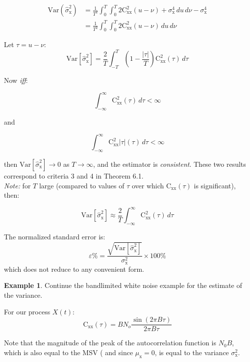 \documentclass[12pt]{book}
\theoremstyle{definition}
\newtheorem{exmp}{Example}[chapter]
\begin{document}
\[
\begin{aligned}
    \mathrm{Var}(\hat{\sigma}^2_\mathrm{x}) & = \frac{1}{T^2} \int_0^T \int_0^T 2 \mathrm{C}^2_\mathrm{xx}(u-\nu) + \sigma^4_\mathrm{x}  \, du \, d \nu - \sigma^4_\mathrm{x} \\
    & = \frac{1}{T^2} \int_0^T \int_0^T 2 \mathrm{C}^2_\mathrm{xx}(u-\nu) \, du \, d \nu
\end{aligned}
\]

Let \(\tau = u - \nu\):
\[
\mathrm{Var}[\hat{\sigma}^2_\mathrm{x}] = \frac{2}{T}\int_{-T}^T \left ( 1 - \frac{|\tau|}{T}\right ) \mathrm{C}^2_\mathrm{xx}(\tau) \, d \tau
\]

Now \emph{iff}:

\[
\int_{-\infty}^\infty \mathrm{C}^2_\mathrm{xx} (\tau) \, d \tau < \infty
\]

and

\[
\int_{-\infty}^\infty \mathrm{C}^2_\mathrm{xx} |\tau|(\tau) \, d \tau < \infty
\]

then \(\text{Var}[\hat{\sigma}^2_\mathrm{x}] \rightarrow 0\) as \(T \rightarrow \infty\), and the estimator is \emph{consistent}. These two results correspond to criteria 3 and 4 in Theorem 6.1.\\

\emph{Note:} for \(T\) large (compared to values of \(\tau\) over which $\mathrm{C}_\mathrm{xx} (\tau)$ is significant), then: 

\[
\boxed{\mathrm{Var} [\hat{\sigma}^2_\mathrm{x}] \approx \frac{2}{T}\int_{-\infty}^\infty \mathrm{C}^2_\mathrm{xx}(\tau) \, d \tau}
\]

The normalized standard error is:
\[
\varepsilon \% = \frac{\sqrt{\mathrm{Var}[\hat{\sigma}^2_\mathrm{x}]}}{\sigma^2_\mathrm{x}} \times 100\%
\]
which does not reduce to any convenient form.

\begin{tcolorbox}
    \begin{exmp}{Continue the bandlimited white noise example for the estimate of the variance.}
   
    \end{exmp}
\end{tcolorbox}

For our process \(X(t)\):
\[
\mathrm{C}_\mathrm{xx}(\tau) =  B N_o \frac{\sin(2 \pi B \tau)}{2 \pi B \tau} 
\]

Note that the magnitude of the peak of the autocorrelation function is \(N_0 B\), which is also equal to the MSV ( and since \(\mu_\mathrm{x} = 0\), is equal to the variance \(\sigma^2_\mathrm{x}\).
\end{document}
